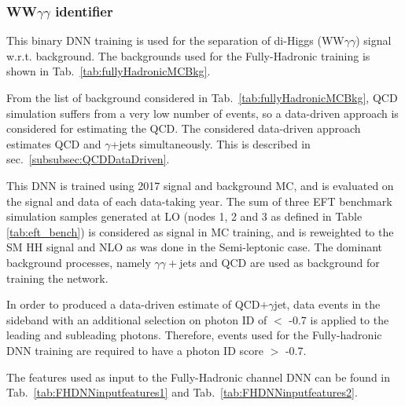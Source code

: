 \subsubsection{WW$\gamma\gamma$ identifier}

This binary DNN training is used for the separation of di-Higgs (WW$\gamma\gamma$) signal w.r.t. background. The backgrounds used for the Fully-Hadronic
training is shown in Tab.~\ref{tab:fullyHadronicMCBkg}.

From the list of background considered in Tab.~\ref{tab:fullyHadronicMCBkg}, QCD simulation suffers from a very low number of events, so a data-driven approach is considered for estimating the QCD. The considered data-driven approach estimates QCD and $\gamma$+jets simultaneously. This is described in sec.~\ref{subsubsec:QCDDataDriven}.

This DNN is trained using 2017 signal and background MC, and is evaluated on the signal and data of each data-taking year. The sum of three EFT benchmark simulation samples generated at LO (nodes 1, 2 and 3 as defined in Table \ref{tab:eft_bench}) is considered as signal in MC training, and is reweighted to the SM HH signal and NLO as was done in the Semi-leptonic case. The dominant background processes, namely $\gamma\gamma+$jets and QCD are used as background for training the network.


In order to produced a data-driven estimate of QCD$+\gamma$jet, data events in the sideband with an additional selection on photon ID of $<$ -0.7 is applied to the leading and subleading photons. Therefore, events used for the Fully-hadronic DNN training are required to have a photon ID score $>$ -0.7. 


The features used as input to the Fully-Hadronic channel DNN can be found in Tab.~\ref{tab:FHDNNinputfeatures1} and Tab.~\ref{tab:FHDNNinputfeatures2}.

